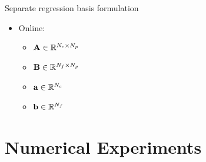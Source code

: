 \documentclass[]{beamer}
\begin{document}
\begin{frame}{Separate regression basis formulation}
\begin{minipage}{0.49\linewidth}
\begin{itemize}
\begin{itemize}
			\end{itemize}
			\vspace{0.7em}
		\end{itemize}
	\end{minipage}
	\begin{minipage}{0.49\linewidth}
		\begin{itemize}
			\item Online:
			\begin{itemize}
				\item $\mathbf{A} \in \mathbb{R}^{N_c \times N_p}$
				\item $\mathbf{B} \in \mathbb{R}^{N_f \times N_p}$
				\item $\mathbf{a} \in \mathbb{R}^{N_c}$
				\item $\mathbf{b} \in \mathbb{R}^{N_f}$
			\end{itemize}
		\end{itemize}
	\end{minipage}
\end{frame}

\section*{Numerical Experiments}
\end{document}
